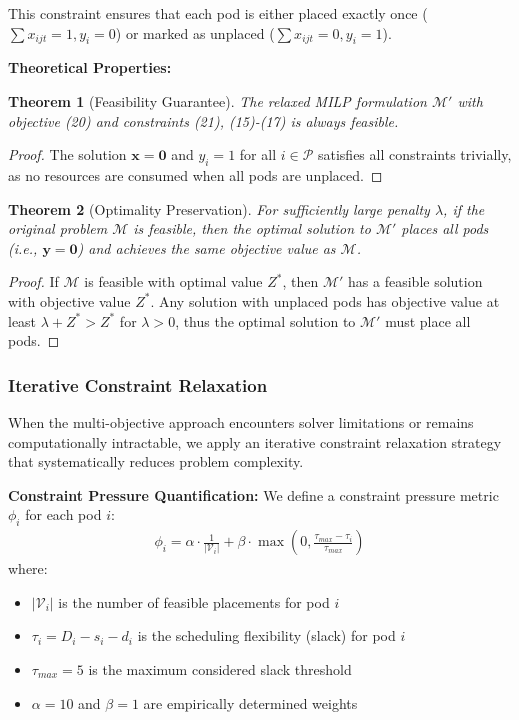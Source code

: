 \documentclass{article}
\newtheorem{theorem}{Theorem}[section]
\begin{document}
This constraint ensures that each pod is either placed exactly once ($\sum x_{ijt} = 1, y_i = 0$) or marked as unplaced ($\sum x_{ijt} = 0, y_i = 1$).

\textbf{Theoretical Properties:}

\begin{theorem}[Feasibility Guarantee]
The relaxed MILP formulation $\mathcal{M}'$ with objective (20) and constraints (21), (15)-(17) is always feasible.
\end{theorem}

\begin{proof}
The solution $\mathbf{x} = \mathbf{0}$ and $y_i = 1$ for all $i \in \mathcal{P}$ satisfies all constraints trivially, as no resources are consumed when all pods are unplaced.
\end{proof}

\begin{theorem}[Optimality Preservation]
For sufficiently large penalty $\lambda$, if the original problem $\mathcal{M}$ is feasible, then the optimal solution to $\mathcal{M}'$ places all pods (i.e., $\mathbf{y} = \mathbf{0}$) and achieves the same objective value as $\mathcal{M}$.
\end{theorem}

\begin{proof}
If $\mathcal{M}$ is feasible with optimal value $Z^*$, then $\mathcal{M}'$ has a feasible solution with objective value $Z^*$. Any solution with unplaced pods has objective value at least $\lambda + Z^* > Z^*$ for $\lambda > 0$, thus the optimal solution to $\mathcal{M}'$ must place all pods.
\end{proof}

\subsubsection{Iterative Constraint Relaxation}

When the multi-objective approach encounters solver limitations or remains computationally intractable, we apply an iterative constraint relaxation strategy that systematically reduces problem complexity.

\textbf{Constraint Pressure Quantification:}
We define a constraint pressure metric $\phi_i$ for each pod $i$:
\begin{align}
\phi_i = \alpha \cdot \frac{1}{|\mathcal{V}_i|} + \beta \cdot \max\left(0, \frac{\tau_{max} - \tau_i}{\tau_{max}}\right)
\end{align}
where:
\begin{itemize}
\item $|\mathcal{V}_i|$ is the number of feasible placements for pod $i$
\item $\tau_i = D_i - s_i - d_i$ is the scheduling flexibility (slack) for pod $i$
\item $\tau_{max} = 5$ is the maximum considered slack threshold
\item $\alpha = 10$ and $\beta = 1$ are empirically determined weights
\end{itemize}
\end{document}
